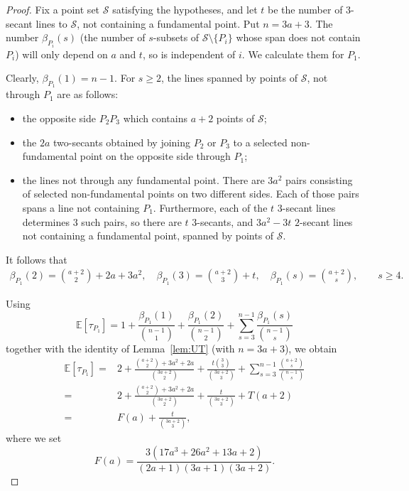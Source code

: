 \documentclass{article}
\begin{document}
\begin{proof}
Fix a point set $\mathcal S$ satisfying the hypotheses, and let $t$ be
the number of $3$-secant lines to $\mathcal{S}$, not containing a fundamental point. Put $n=3a+3.$
The number $\beta_{P_i}(s)$ (the number of $s$-subsets of
$\mathcal S\setminus\{P_i\}$ whose span does not contain
$P_i$) will only depend on $a$ and $t$, so is independent of $i$.  We calculate them for $P_1$.

Clearly, $\beta_{P_1}(1)=n-1.$
For $s\geq2$, the lines spanned by points of $\mathcal{S}$, not through $P_1$ are as follows:
\begin{itemize}
\item the opposite side $P_2P_3$ which contains $a+2$ points of
$\mathcal S$;
\item the $2a$ two-secants obtained by
joining $P_2$ or $P_3$ to a selected non-fundamental point on the
opposite side through $P_1$;
\item the lines not through any fundamental point. There are $3a^2$ pairs consisting of selected non-fundamental points on
two different sides.  Each of those pairs spans a line not containing $P_1$. Furthermore, each of the $t$ $3$-secant lines determines $3$ such pairs, so there are $t$ $3$-secants, and $3a^2-3t$ $2$-secant lines not containing a fundamental point, spanned by points of $\mathcal{S}$.
\end{itemize}
It follows that
\begin{align*}
\beta_{P_1}(2)
  =\binom{a+2}{2}+2a+3a^2,\quad
\beta_{P_1}(3)
 =\binom{a+2}{3}+t,\quad
\beta_{P_1}(s)
 =\binom{a+2}{s},\qquad s\geq4.
\end{align*}


Using
\[
\mathbb E[\tau_{P_1}]
 =1+\frac{\beta_{P_1}(1)}{\binom{n-1}{1}}
   +\frac{\beta_{P_1}(2)}{\binom{n-1}{2}}
   +\sum_{s=3}^{n-1}\frac{\beta_{P_1}(s)}{\binom{n-1}{s}}
\]
together with the identity of Lemma~\ref{lem:UT} (with $n=3a+3$), 
we obtain
\begin{align}
\mathbb E[\tau_{P_1}]={}&2+\frac{\binom{a+2}{2}+3a^2+2a}{\binom{3a+2}{2}}+\frac{t\binom{3}{3}}{\binom{3a+2}{3}}
     +\sum_{s=3}^{n-1}\frac{\binom{a+2}{s}}{\binom{n-1}{s}}
    \nonumber\\
={}&2+\frac{\binom{a+2}{2}+3a^2+2a}{\binom{3a+2}{2}}
     +\frac{t}{\binom{3a+2}{3}}+T(a+2)\nonumber\\
={}&F(a)+\frac{t}{\binom{3a+2}{3}},
\label{eq:expectation-a-t}
\end{align}
where we set
\begin{equation}
\label{eq:F-a-definition}
F(a)=
\frac{3(17a^3+26a^2+13a+2)}
     {(2a+1)(3a+1)(3a+2)}.
\end{equation}



\end{proof}
\end{document}
